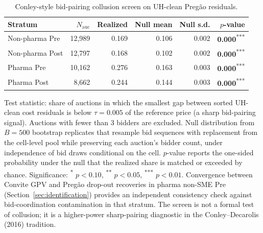 \begin{table}[!htbp]
\centering
\begin{threeparttable}
\caption{Conley-style bid-pairing collusion screen on UH-clean Preg\~ao residuals.}
\label{tab:collusion_screen}
\small
\setlength{\tabcolsep}{6pt}
\providecommand{\sym}[1]{\textsuperscript{#1}}
\begin{tabular}{lrrrrr}
\toprule
Stratum & $N_{\mathrm{auc}}$ & Realized & Null mean & Null s.d. & $p$-value \\
\midrule
Non-pharma Pre & 12,989 & 0.169 & 0.106 & 0.002 & \textbf{0.000}\sym{***} \\
Non-pharma Post & 12,797 & 0.168 & 0.102 & 0.002 & \textbf{0.000}\sym{***} \\
Pharma Pre & 10,162 & 0.276 & 0.163 & 0.003 & \textbf{0.000}\sym{***} \\
Pharma Post & 8,662 & 0.244 & 0.144 & 0.003 & \textbf{0.000}\sym{***} \\
\bottomrule
\end{tabular}
\begin{tablenotes}[flushleft]\footnotesize
\item Test statistic: share of auctions in which the smallest gap between sorted UH-clean cost residuals is below $\tau = 0.005$ of the reference price (a sharp bid-pairing signal). Auctions with fewer than 3 bidders are excluded. Null distribution from $B = 500$ bootstrap replicates that resample bid sequences with replacement from the cell-level pool while preserving each auction's bidder count, under independence of bid draws conditional on the cell. $p$-value reports the one-sided probability under the null that the realized share is matched or exceeded by chance. Significance: \sym{*} $p<0.10$, \sym{**} $p<0.05$, \sym{***} $p<0.01$. Convergence between Convite GPV and Preg\~ao drop-out recoveries in pharma non-SME Pre (Section~\ref{sec:identification}) provides an independent consistency check against bid-coordination contamination in that stratum. The screen is not a formal test of collusion; it is a higher-power sharp-pairing diagnostic in the Conley--Decarolis (2016) tradition.
\end{tablenotes}
\end{threeparttable}
\end{table}
